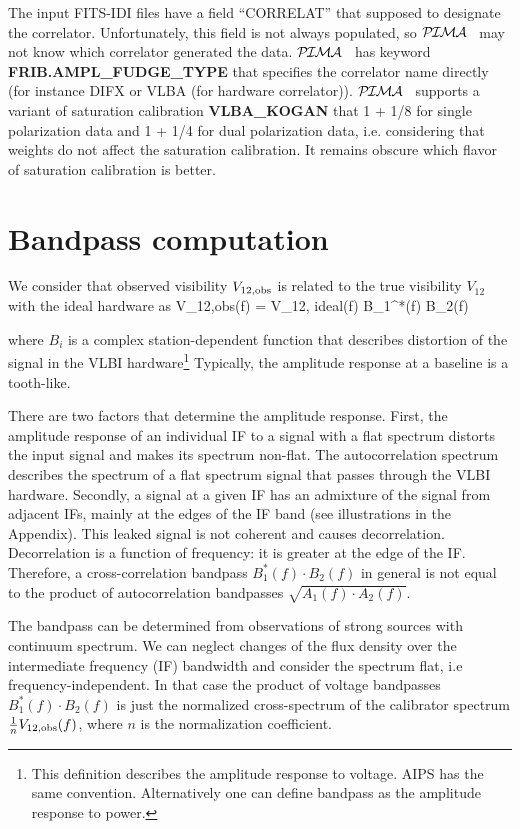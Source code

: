 \documentclass[11pt]{article}
\newcommand{\Blb}[1]{\textcolor{Dblue}{\bf #1}}
\newcommand{\PIMA}{\textcolor{Dgreen}{$\cal P\hspace{-0.067em}I\hspace{-0.067em}M\hspace{-0.067em}A$} }
\begin{document}
  The input FITS-IDI files have a field ``CORRELAT'' that supposed to designate
the correlator. Unfortunately, this field is not always populated, so \PIMA\ 
may not know which correlator generated the data. \PIMA\ has keyword
\Blb{FRIB.AMPL\_FUDGE\_TYPE} that specifies the correlator name directly
(for instance DIFX or VLBA (for hardware correlator)). \PIMA\ supports 
a variant of saturation calibration \Blb{VLBA\_KOGAN} that 1 + 1/8 
for single polarization data and 1 + 1/4 for dual polarization data, i.e.
considering that weights do not affect the saturation calibration. 
It remains obscure which flavor of saturation calibration is better.

\section{Bandpass computation}

   We consider that observed visibility $V_{\rm 12,obs}$ is related to
the true visibility $V_{12}$ with the ideal hardware as
%
\beq
   V_{\rm 12,obs}(f) = V_{\rm 12, ideal}(f) \: B_1^{*}(f) \cdot B_2(f)
\eeq{e:e1}

  where $B_i$ is a complex station-dependent function that describes
distortion of the signal in the VLBI hardware\footnote{This definition 
describes the amplitude response to voltage. AIPS has the same convention.
Alternatively one can define bandpass as the amplitude response 
to power.} Typically, the amplitude response at a baseline is a tooth-like. 

  There are two factors that determine the amplitude response. First, 
the amplitude response of an individual IF to a signal with a flat spectrum
distorts the input signal and makes its spectrum non-flat. The autocorrelation
spectrum describes the spectrum of a flat spectrum signal that passes through
the VLBI hardware. Secondly, a signal at a given IF has an admixture of the 
signal from adjacent IFs, mainly at the edges of the IF band (see 
illustrations in the Appendix). This leaked signal is not coherent and causes 
decorrelation. Decorrelation is a function of frequency: it is greater at 
the edge of the IF. Therefore, a cross-correlation bandpass 
$B_1^{*}(f) \cdot B_2(f)$ in general is not equal to the product of 
autocorrelation bandpasses $\sqrt{A_1(f) \cdot A_2(f)}$.

  The bandpass can be determined from observations of strong sources
with continuum spectrum. We can neglect changes of the flux density
over the intermediate frequency (IF) bandwidth and consider the spectrum
flat, i.e frequency-independent.  In that case the product of voltage 
bandpasses $B_1^{*}(f) \cdot B_2(f)$ is just the normalized cross-spectrum
of the calibrator spectrum $\frac{1}{n} V_{\rm 12,obs}(f)$, where 
$n$ is the normalization coefficient.
\end{document}
